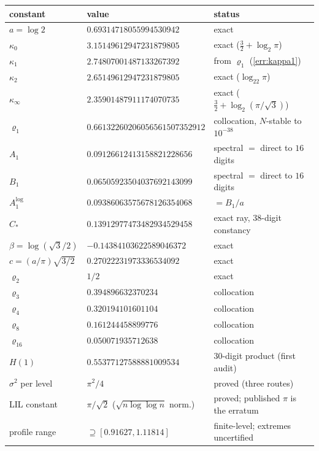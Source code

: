 \documentclass[11pt,oneside]{article}
\theoremstyle{definition}
\theoremstyle{remark}
\begin{document}
\begin{center}
\small
\begin{tabular}{@{}lll@{}}
\toprule
constant & value & status \\
\midrule
$a=\log2$ & $0.69314718055994530942$ & exact \\
$\kappa_0$ & $3.15149612947231879805$ & exact ($\tfrac32+\log_2\pi$) \\
$\kappa_1$ & $2.74807001487133267392$ & from $\varrho_1$ (\cref{err:kappa1}) \\
$\kappa_2$ & $2.65149612947231879805$ & exact ($\log_22\pi$) \\
$\kappa_\infty$ & $2.35901487911174070735$ & exact ($\tfrac32+\log_2(\pi/\sqrt3)$) \\
$\varrho_1$ & $0.66132260206056561507352912$ & collocation, $N$-stable to $10^{-38}$ \\
$A_1$ & $0.09126612413158821228656$ & spectral $=$ direct to $16$ digits \\
$B_1$ & $0.06505923504037692143099$ & spectral $=$ direct to $16$ digits \\
$A_1^{\log}$ & $0.09386063575678126354068$ & $=B_1/a$ \\
$C_*$ & $0.13912977473482934529458$ & exact ray, $38$-digit constancy \\
$\beta=\log(\sqrt3/2)$ & $-0.14384103622589046372$ & exact \\
$c=(a/\pi)\sqrt{3/2}$ & $0.27022231973336534092$ & exact \\
$\varrho_2$ & $1/2$ & exact \\
$\varrho_3$ & $0.394896632370234$ & collocation \\
$\varrho_4$ & $0.320194101601104$ & collocation \\
$\varrho_8$ & $0.161244458899776$ & collocation \\
$\varrho_{16}$ & $0.050071935712638$ & collocation \\
$H(1)$ & $0.55377127588881009534$ & 30-digit product (first audit) \\
$\sigma^2$ per level & $\pi^2/4$ & proved (three routes) \\
LIL constant & $\pi/\sqrt2$ ($\sqrt{n\log\log n}$ norm.) & proved; published $\pi$ is the erratum \\
profile range & $\supseteq[0.91627,1.11814]$ & finite-level; extremes uncertified \\
\bottomrule
\end{tabular}
\end{center}
\end{document}
